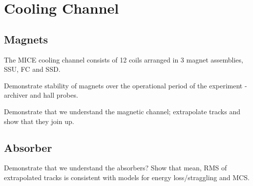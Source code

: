 \section{Cooling Channel}
\label{Sect:CoolingChannel}


\subsection{Magnets}

The MICE cooling channel consists of 12 coils arranged in 3 magnet assemblies, 
SSU, FC and SSD.

Demonstrate stability of magnets over the operational period of the experiment -
archiver and hall probes.

Demonstrate that we understand the magnetic channel; extrapolate tracks and 
show that they join up.

\subsection{Absorber}

Demonstrate that we understand the absorbers? Show that mean, RMS of extrapolated 
tracks is consistent with models for energy loss/straggling and MCS.

